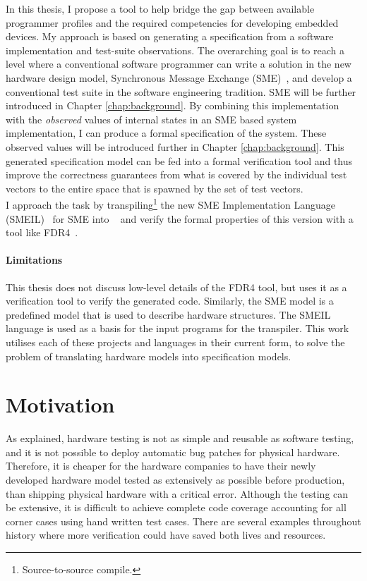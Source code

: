 In this thesis, I propose a tool to help bridge the gap between available programmer profiles and the required competencies for developing embedded devices. My approach is based on generating a specification from a software implementation and test-suite observations. The overarching goal is to reach a level where a conventional software programmer can write a solution in the new hardware design model, Synchronous Message Exchange (SME)~\cite{Vinter2014, Vinter2015, Skovhede}, and develop a conventional test suite in the software engineering tradition. SME will be further introduced in Chapter \ref{chap:background}. By combining this implementation with the \emph{observed} values of internal states in an SME based system implementation, I can produce a formal specification of the system. These observed values will be introduced further in Chapter \ref{chap:background}.
This generated specification model can be fed into a formal verification tool and thus improve the correctness guarantees from what is covered by the individual test vectors to the entire space that is spawned by the set of test vectors.\\

I approach the task by transpiling\footnote{Source-to-source compile.} the new SME Implementation Language (SMEIL)~\cite{smeil} for SME into \cspm{}~\cite{Scattergood1998} and verify the formal properties of this version with a tool like FDR4~\cite{fdr}.
\paragraph{Limitations}
This thesis does not discuss low-level details of the FDR4 tool, but uses it as a verification tool to verify the generated \cspm{} code.
Similarly, the SME model is a predefined model that is used to describe hardware structures.
The SMEIL language is used as a basis for the input programs for the transpiler.
This work utilises each of these projects and languages in their current form, to solve the problem of translating hardware models into specification models.
\section{Motivation}
As explained, hardware testing is not as simple and reusable as software testing, and it is not possible to deploy automatic bug patches for physical hardware. Therefore, it is cheaper for the hardware companies to have their newly developed hardware model tested as extensively as possible before production, than shipping physical hardware with a critical error. Although the testing can be extensive, it is difficult to achieve complete code coverage accounting for all corner cases using hand written test cases. There are several examples throughout history where more verification could have saved both lives and resources.
